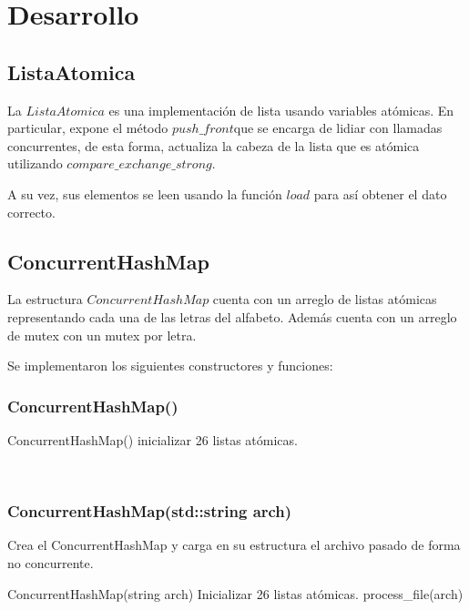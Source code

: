 \section{Desarrollo}

\subsection{ListaAtomica}

La $ListaAtomica$ es una implementación de lista usando variables atómicas. En particular, expone el método $push\_front$que se encarga de lidiar con llamadas concurrentes, de esta forma, actualiza la cabeza de la lista que es atómica utilizando $compare\_exchange\_strong$.

A su vez, sus elementos se leen usando la función $load$ para así obtener el dato correcto.

\subsection{ConcurrentHashMap}

La estructura $ConcurrentHashMap$ cuenta con un arreglo de listas atómicas representando cada una de las letras del alfabeto. Además cuenta con un arreglo de mutex con un mutex por letra. 

Se implementaron los siguientes constructores y funciones:\\

\subsubsection{ConcurrentHashMap()}
\begin{codesnippet}
ConcurrentHashMap()
 	inicializar 26 listas atómicas.
\end{codesnippet}\\

\subsubsection{ConcurrentHashMap(std::string arch)}
Crea el ConcurrentHashMap y carga en su estructura el archivo pasado de forma no concurrente.\\
\begin{codesnippet}
ConcurrentHashMap(string arch)
 	Inicializar 26 listas atómicas.
 	process_file(arch)
\end{codesnippet}\\

